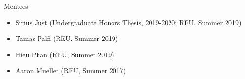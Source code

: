 \documentclass{resume} %
\begin{document}

\begin{rSection}{Mentees}

\begin{itemize}
\item Sirius Just (Undergraduate Honors Thesis, 2019-2020; REU, Summer 2019) 
\item Tamas Palfi (REU, Summer 2019) 
\item Hieu Phan (REU, Summer 2019) 
\item Aaron Mueller (REU, Summer 2017) 
\end{itemize}

\end{rSection}






\end{document}
